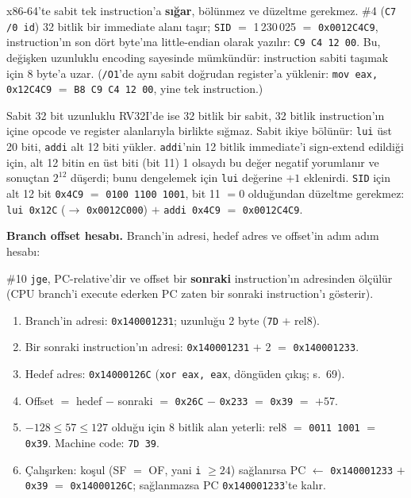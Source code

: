 \documentclass[11pt,a4paper]{article}
\newcommand{\tl}{\texttt}
\begin{document}
x86-64'te sabit tek instruction'a \textbf{sığar}, bölünmez ve düzeltme gerekmez. \#4
(\tl{C7 /0 id}) 32 bitlik bir immediate alanı taşır; \tl{SID} $=$ 1\,230\,025 $=$
\tl{0x0012C4C9}, instruction'ın son dört byte'ına little-endian olarak yazılır:
\tl{C9 C4 12 00}. Bu, değişken uzunluklu encoding sayesinde mümkündür: instruction sabiti
taşımak için 8 byte'a uzar. (\tl{/O1}'de aynı sabit doğrudan register'a yüklenir:
\tl{mov eax, 0x12C4C9} $=$ \tl{B8 C9 C4 12 00}, yine tek instruction.)

Sabit 32 bit uzunluklu RV32I'de ise 32 bitlik bir sabit, 32 bitlik instruction'ın içine opcode ve
register alanlarıyla birlikte sığmaz. Sabit ikiye bölünür: \tl{lui} üst 20 biti, \tl{addi} alt
12 biti yükler. \tl{addi}'nin 12 bitlik immediate'i sign-extend edildiği için, alt 12 bitin en
üst biti (bit 11) 1 olsaydı bu değer negatif yorumlanır ve sonuçtan $2^{12}$ düşerdi; bunu
dengelemek için \tl{lui} değerine $+1$ eklenirdi. \tl{SID} için alt 12 bit
\tl{0x4C9} $=$ \tl{0100 1100 1001}, bit 11 $= 0$ olduğundan düzeltme gerekmez:
\tl{lui 0x12C} ($\to$ \tl{0x0012C000}) $+$ \tl{addi 0x4C9} $=$ \tl{0x0012C4C9}.

\textbf{Branch offset hesabı.} Branch'in adresi, hedef adres ve offset'in adım adım hesabı:

\#10 \tl{jge}, PC-relative'dir ve offset bir \textbf{sonraki} instruction'ın adresinden ölçülür
(CPU branch'i execute ederken PC zaten bir sonraki instruction'ı gösterir).

\begin{enumerate}[leftmargin=2em,itemsep=1pt,topsep=2pt]
\item Branch'in adresi: \tl{0x140001231}; uzunluğu 2 byte (\tl{7D} $+$ rel8).
\item Bir sonraki instruction'ın adresi: \tl{0x140001231} $+$ 2 $=$ \tl{0x140001233}.
\item Hedef adres: \tl{0x14000126C} (\tl{xor eax, eax}, döngüden çıkış; s.~69).
\item Offset $=$ hedef $-$ sonraki $=$ \tl{0x26C} $-$ \tl{0x233} $=$ \tl{0x39} $=$ $+57$.
\item $-128 \le 57 \le 127$ olduğu için 8 bitlik alan yeterli: rel8 $=$ \tl{0011 1001} $=$
\tl{0x39}. Machine code: \tl{7D 39}.
\item Çalışırken: koşul (SF $=$ OF, yani \tl{i} $\ge 24$) sağlanırsa PC $\leftarrow$
\tl{0x140001233} $+$ \tl{0x39} $=$ \tl{0x14000126C}; sağlanmazsa PC \tl{0x140001233}'te kalır.
\end{enumerate}
\end{document}
